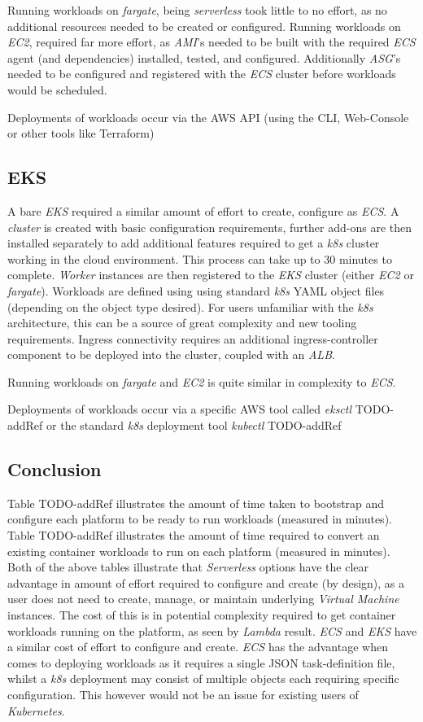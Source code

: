 Running workloads on \textit{fargate}, being \textit{serverless} took little to no effort, as no additional resources needed to be created or configured.
Running workloads on \textit{EC2}, required far more effort, as \textit{AMI}'s needed to be built with the required \textit{ECS} agent (and dependencies) installed, tested,
and configured. Additionally \textit{ASG}'s needed to be configured and registered with the \textit{ECS} cluster before workloads would be scheduled.

Deployments of workloads occur via the AWS API (using the CLI, Web-Console or other tools like Terraform)

\subsection{EKS}
A bare \textit{EKS} required a similar amount of effort to create, configure as \textit{ECS}. A \emph{cluster} is created with basic configuration requirements,
further add-ons are then installed separately to add additional features required to get a \textit{k8s} cluster working in the cloud environment.
This process can take up to 30 minutes to complete.
\textit{Worker} instances are then registered to the \textit{EKS} cluster (either \textit{EC2} or \textit{fargate}).
Workloads are defined using using standard \textit{k8s} YAML object files (depending on the object type desired).
For users unfamiliar with the \textit{k8s} architecture, this can be a source of great complexity and new tooling requirements.
Ingress connectivity requires an additional ingress-controller component to be deployed into the cluster, coupled with an \textit{ALB}.

Running workloads on \textit{fargate} and \textit{EC2} is quite similar in complexity to \textit{ECS}.

Deployments of workloads occur via a specific AWS tool called \emph{eksctl} TODO-addRef or the standard \textit{k8s} deployment tool \emph{kubectl} TODO-addRef

\subsection*{Conclusion}
Table TODO-addRef illustrates the amount of time taken to bootstrap and configure each platform to be ready to run workloads (measured in minutes).
Table TODO-addRef illustrates the amount of time required to convert an existing container workloads to run on each platform (measured in minutes).
Both of the above tables illustrate that \textit{Serverless} options have the clear advantage in amount of effort required to configure and create (by design), as a user does not need to
create, manage, or maintain underlying \textit{Virtual Machine} instances. The cost of this is in potential complexity required to get container workloads running on the
platform, as seen by \textit{Lambda} result.
\textit{ECS} and \textit{EKS} have a similar cost of effort to configure and create. \textit{ECS} has the advantage when comes to deploying workloads as it requires a
single JSON task-definition file, whilst a \textit{k8s} deployment may consist of multiple objects each requiring specific configuration.
This however would not be an issue for existing users of \textit{Kubernetes}.

